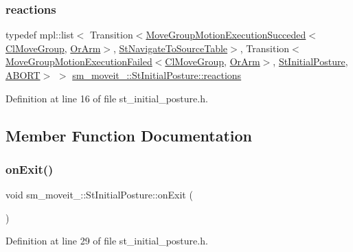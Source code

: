 \subsubsection{\texorpdfstring{reactions}{reactions}}
{\footnotesize\ttfamily typedef mpl\+::list$<$ Transition$<$\hyperlink{structmoveit__z__client_1_1MoveGroupMotionExecutionSucceded}{Move\+Group\+Motion\+Execution\+Succeded}$<$\hyperlink{classmoveit__z__client_1_1ClMoveGroup}{Cl\+Move\+Group}, \hyperlink{classsm__moveit__4_1_1OrArm}{Or\+Arm}$>$, \hyperlink{structsm__moveit__4_1_1StNavigateToSourceTable}{St\+Navigate\+To\+Source\+Table}$>$, Transition$<$\hyperlink{structmoveit__z__client_1_1MoveGroupMotionExecutionFailed}{Move\+Group\+Motion\+Execution\+Failed}$<$\hyperlink{classmoveit__z__client_1_1ClMoveGroup}{Cl\+Move\+Group}, \hyperlink{classsm__moveit__4_1_1OrArm}{Or\+Arm}$>$, \hyperlink{structsm__moveit__4_1_1StInitialPosture}{St\+Initial\+Posture}, \hyperlink{classABORT}{A\+B\+O\+RT}$>$ $>$ \hyperlink{structsm__moveit__4_1_1StInitialPosture_aba6b4f6994263b0b57c50986b9db3497}{sm\+\_\+moveit\+\_\+::\+St\+Initial\+Posture\+::reactions}}



Definition at line 16 of file st\+\_\+initial\+\_\+posture.\+h.



\subsection{Member Function Documentation}
\mbox{\label{structsm__moveit__4_1_1StInitialPosture_a13d072d68463d6aeafb5e07dbec2aaa2}} 
\subsubsection{\texorpdfstring{on\+Exit()}{onExit()}}
{\footnotesize\ttfamily void sm\+\_\+moveit\+\_\+::\+St\+Initial\+Posture\+::on\+Exit (\begin{DoxyParamCaption}{ }\end{DoxyParamCaption})\hspace{0.3cm}{\ttfamily [inline]}}



Definition at line 29 of file st\+\_\+initial\+\_\+posture.\+h.



